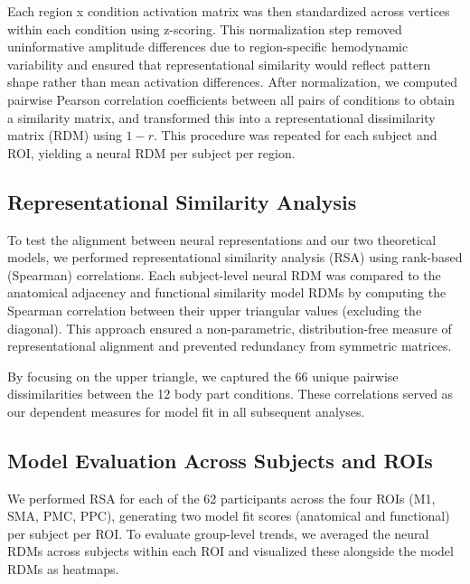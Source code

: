 \documentclass{article}
\begin{document}
Each region x condition activation matrix was then standardized across vertices within each condition using z-scoring. This normalization step removed uninformative amplitude differences due to region-specific hemodynamic variability and ensured that representational similarity would reflect pattern shape rather than mean activation differences. After normalization, we computed pairwise Pearson correlation coefficients between all pairs of conditions to obtain a similarity matrix, and transformed this into a representational dissimilarity matrix (RDM) using $1-r$. This procedure was repeated for each subject and ROI, yielding a neural RDM per subject per region.

\subsection{Representational Similarity Analysis}
To test the alignment between neural representations and our two theoretical models, we performed representational similarity analysis (RSA) using rank-based (Spearman) correlations. Each subject-level neural RDM was compared to the anatomical adjacency and functional similarity model RDMs by computing the Spearman correlation between their upper triangular values (excluding the diagonal). This approach ensured a non-parametric, distribution-free measure of representational alignment and prevented redundancy from symmetric matrices.

By focusing on the upper triangle, we captured the 66 unique pairwise dissimilarities between the 12 body part conditions. These correlations served as our dependent measures for model fit in all subsequent analyses.

\subsection{Model Evaluation Across Subjects and ROIs}
We performed RSA for each of the 62 participants across the four ROIs (M1, SMA, PMC, PPC), generating two model fit scores (anatomical and functional) per subject per ROI. To evaluate group-level trends, we averaged the neural RDMs across subjects within each ROI and visualized these alongside the model RDMs as heatmaps.

\end{document}
